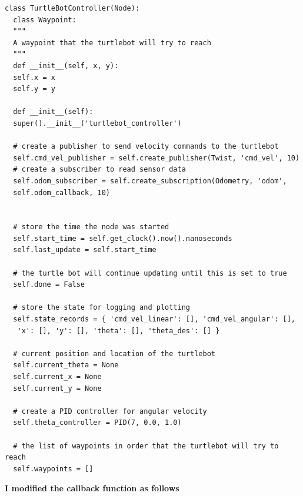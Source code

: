 \documentclass{article}
\begin{document}
\begin{verbatim}
class TurtleBotController(Node):
  class Waypoint:
  """
  A waypoint that the turtlebot will try to reach
  """
  def __init__(self, x, y):  
  self.x = x
  self.y = y
  
  def __init__(self):
  super().__init__('turtlebot_controller')

  # create a publisher to send velocity commands to the turtlebot
  self.cmd_vel_publisher = self.create_publisher(Twist, 'cmd_vel', 10)
  # create a subscriber to read sensor data
  self.odom_subscriber = self.create_subscription(Odometry, 'odom', 
  self.odom_callback, 10)


  # store the time the node was started
  self.start_time = self.get_clock().now().nanoseconds
  self.last_update = self.start_time

  # the turtle bot will continue updating until this is set to true
  self.done = False

  # store the state for logging and plotting
  self.state_records = { 'cmd_vel_linear': [], 'cmd_vel_angular': [],
   'x': [], 'y': [], 'theta': [], 'theta_des': [] }

  # current position and location of the turtlebot
  self.current_theta = None
  self.current_x = None
  self.current_y = None

  # create a PID controller for angular velocity
  self.theta_controller = PID(7, 0.0, 1.0)

  # the list of waypoints in order that the turtlebot will try to reach
  self.waypoints = []

\end{verbatim}

\noindent \textbf{I modified the callback function as follows}
\end{document}
